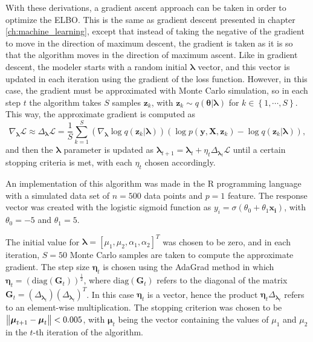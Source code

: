 With these derivations, a gradient ascent approach can be taken in order to optimize the ELBO. This is the same as gradient descent presented in chapter \ref{ch:machine_learning}, except that instead of taking the negative of the gradient to move in the direction of maximum descent, the gradient is taken as it is so that the algorithm moves in the direction of maximum ascent. Like in gradient descent, the modeler starts with a random initial $\boldsymbol{\lambda}$ vector, and this vector is updated in each iteration using the gradient of the loss function. However, in this case, the gradient must be approximated with Monte Carlo simulation, so in each step $t$ the algorithm takes $S$ samples $\boldsymbol{z}_k$, with $\boldsymbol{z}_k \sim q(\boldsymbol{\theta} | \boldsymbol{\lambda})$ for $k \in \left\{1, \cdots, S \right\}$. This way, the approximate gradient is computed as
\begin{equation}
  \nabla_{\boldsymbol{\lambda}} \mathcal{L} \approx \Delta_{\boldsymbol{\lambda}} \mathcal{L} = \frac{1}{S} \sum_{k = 1}^S \left( \nabla_{\boldsymbol{\lambda}} \log q(\boldsymbol{z}_k | \boldsymbol{\lambda}) \right) \left( \log p(\boldsymbol{y}, \boldsymbol{X}, \boldsymbol{z}_k) - \log q(\boldsymbol{z}_k | \boldsymbol{\lambda}) \right),
\end{equation}
and then the $\boldsymbol{\lambda}$ parameter is updated as $\boldsymbol{\lambda}_{t+1} = \boldsymbol{\lambda}_{t} + \eta_t  \Delta_{\boldsymbol{\lambda}_t} \mathcal{L}$ until a certain stopping criteria is met, with each $\eta_t$ chosen accordingly.

An implementation of this algorithm was made in the R programming language with a simulated data set of $n = 500$ data points and $p = 1$ feature. The response vector was created with the logistic sigmoid function as $y_i = \sigma(\theta_0 + \theta_1 \boldsymbol{x_i})$, with $\theta_0 = -5$ and $\theta_1 = 5$.

The initial value for $\boldsymbol{\lambda} = \left[ \mu_1, \mu_2, \alpha_1, \alpha_2 \right]^T$ was chosen to be zero, and in each iteration, $S = 50$ Monte Carlo samples are taken to compute the approximate gradient. The step size $\boldsymbol{\eta}_t$ is chosen using the AdaGrad method \cite{duchi2011adaptive} in which
$\boldsymbol{\eta}_t = \left( \mathrm{diag}(\boldsymbol{G}_t) \right)^{\frac{1}{2}}$, where $\mathrm{diag}(\boldsymbol{G}_t)$
refers to the diagonal of the matrix $\boldsymbol{G}_t = \left( \Delta_{\boldsymbol{\lambda}_t} \right) \left( \Delta_{\boldsymbol{\lambda}_t} \right)^T$.
In this case $\boldsymbol{\eta}_t$ is a vector, hence the product $\boldsymbol{\eta}_t \Delta_{\boldsymbol{\lambda}_t}$ refers to an element-wise multiplication.
The stopping criterion was chosen to be
$\left\lVert \boldsymbol{\mu}_{t+1} - \boldsymbol{\mu}_{t} \right\rVert < 0.005$,
with $\boldsymbol{\mu}_t$ being the vector containing the values of $\mu_1$ and $\mu_2$ in the $t$-th iteration of the algorithm.

